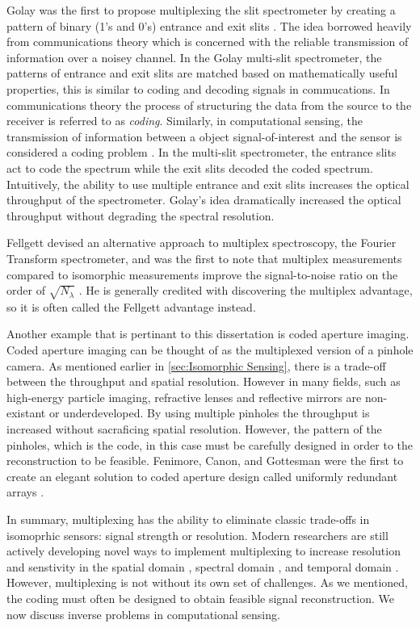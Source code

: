 Golay was the first to propose multiplexing the slit spectrometer by creating a pattern of binary (1's and 0's) entrance and exit slits \cite{golay1949multi}. The idea borrowed heavily from communications theory which is concerned with the reliable transmission of information over a noisey channel. In the Golay multi-slit spectrometer, the patterns of entrance and exit slits are matched based on mathematically useful properties, this is similar to coding and decoding signals in commucations. In communications theory the process of structuring the data from the source to the receiver is referred to as \emph{coding}. Similarly, in computational sensing, the transmission of information between a object signal-of-interest and the sensor is considered a coding problem \cite{brady2009optical}. In the multi-slit spectrometer, the entrance slits act to code the spectrum while the exit slits decoded the coded spectrum. Intuitively, the ability to use multiple entrance and exit slits increases the optical throughput of the spectrometer. Golay's idea dramatically increased the optical throughput without degrading the spectral resolution. 

Fellgett devised an alternative approach to multiplex spectroscopy, the Fourier Transform spectrometer, and was the first to note that multiplex measurements compared to isomorphic measurements improve the signal-to-noise ratio on the order of $ \sqrt{N_{\lambda}}$ \cite{fellgett1958principes}. He is generally credited with discovering the multiplex advantage, so it is often called the Fellgett advantage instead.

Another example that is pertinant to this dissertation is coded aperture imaging. Coded aperture imaging can be thought of as the multiplexed version of a pinhole camera. As mentioned earlier in \autoref{sec:Isomorphic Sensing}, there is a trade-off between the throughput and spatial resolution. However in many fields, such as high-energy particle imaging, refractive lenses and reflective mirrors are non-existant or underdeveloped. By using multiple pinholes the throughput is increased without sacraficing spatial resolution. However, the pattern of the pinholes, which is the code, in this case must be carefully designed in order to the reconstruction to be feasible. Fenimore, Canon, and Gottesman were the first to create an elegant solution to coded aperture design called uniformly redundant arrays \cite{fenimore1978coded, gottesman1989new}.

In summary, multiplexing has the ability to eliminate classic trade-offs in isomoprhic sensors: signal strength or resolution. Modern researchers are still actively developing novel ways to implement multiplexing to increase resolution and senstivity in the spatial domain \cite{duarte2008single, townsend2012static}, spectral domain \cite{gehm2006static, tsai2013coded}, and temporal domain \cite{holloway2012flutter,llull2013coded}. However, multiplexing is not without its own set of challenges. As we mentioned, the coding must often be designed to obtain feasible signal reconstruction. We now discuss inverse problems in computational sensing.

